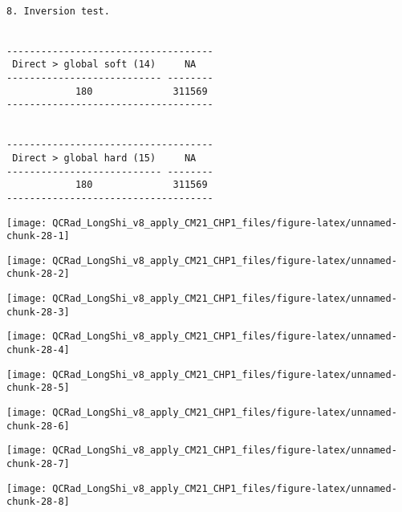 \documentclass[
  10pt,
  a4paper,oneside]{article}
\begin{document}
\begin{verbatim}

8. Inversion test.


------------------------------------
 Direct > global soft (14)     NA   
--------------------------- --------
            180              311569 
------------------------------------


------------------------------------
 Direct > global hard (15)     NA   
--------------------------- --------
            180              311569 
------------------------------------
\end{verbatim}

\begin{center}\texttt{[image: QCRad\_LongShi\_v8\_apply\_CM21\_CHP1\_files/figure-latex/unnamed-chunk-28-1]} \end{center}

\begin{center}\texttt{[image: QCRad\_LongShi\_v8\_apply\_CM21\_CHP1\_files/figure-latex/unnamed-chunk-28-2]} \end{center}

\begin{center}\texttt{[image: QCRad\_LongShi\_v8\_apply\_CM21\_CHP1\_files/figure-latex/unnamed-chunk-28-3]} \end{center}

\begin{center}\texttt{[image: QCRad\_LongShi\_v8\_apply\_CM21\_CHP1\_files/figure-latex/unnamed-chunk-28-4]} \end{center}

\begin{center}\texttt{[image: QCRad\_LongShi\_v8\_apply\_CM21\_CHP1\_files/figure-latex/unnamed-chunk-28-5]} \end{center}

\begin{center}\texttt{[image: QCRad\_LongShi\_v8\_apply\_CM21\_CHP1\_files/figure-latex/unnamed-chunk-28-6]} \end{center}

\begin{center}\texttt{[image: QCRad\_LongShi\_v8\_apply\_CM21\_CHP1\_files/figure-latex/unnamed-chunk-28-7]} \end{center}

\begin{center}\texttt{[image: QCRad\_LongShi\_v8\_apply\_CM21\_CHP1\_files/figure-latex/unnamed-chunk-28-8]} \end{center}
\end{document}
